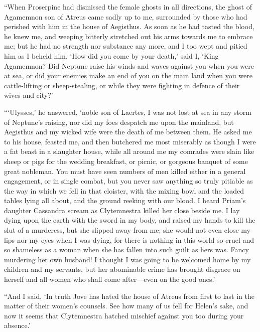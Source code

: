 “When Proserpine had dismissed the female ghosts in all directions, the ghost
of Agamemnon son of Atreus came sadly up to me, surrounded by those who had
perished with him in the house of Aegisthus. As soon as he had tasted the
blood, he knew me, and weeping bitterly stretched out his arms towards me to
embrace me; but he had no strength nor substance any more, and I too wept and
pitied him as I beheld him. ‘How did you come by your death,’ said I, ‘King
Agamemnon? Did Neptune raise his winds and waves against you when you were at
sea, or did your enemies make an end of you on the main land when you were
cattle-lifting or sheep-stealing, or while they were fighting in defence of
their wives and city?’

“‘Ulysses,’ he answered, ‘noble son of Laertes, I was not lost at sea in any
storm of Neptune’s raising, nor did my foes despatch me upon the mainland, but
Aegisthus and my wicked wife were the death of me between them. He asked me to
his house, feasted me, and then butchered me most miserably as though I were a
fat beast in a slaughter house, while all around me my comrades were slain like
sheep or pigs for the wedding breakfast, or picnic, or gorgeous banquet of some
great nobleman. You must have seen numbers of men killed either in a general
engagement, or in single combat, but you never saw anything so truly pitiable
as the way in which we fell in that cloister, with the mixing bowl and the
loaded tables lying all about, and the ground reeking with our blood. I heard
Priam’s daughter Cassandra scream as Clytemnestra killed her close beside me. I
lay dying upon the earth with the sword in my body, and raised my hands to kill
the slut of a murderess, but she slipped away from me; she would not even close
my lips nor my eyes when I was dying, for there is nothing in this world so
cruel and so shameless as a woman when she has fallen into such guilt as hers
was. Fancy murdering her own husband! I thought I was going to be welcomed home
by my children and my servants, but her abominable crime has brought disgrace
on herself and all women who shall come after—even on the good ones.’

“And I said, ‘In truth Jove has hated the house of Atreus from first to last in
the matter of their women’s counsels. See how many of us fell for Helen’s sake,
and now it seems that Clytemnestra hatched mischief against you too during your
absence.’

